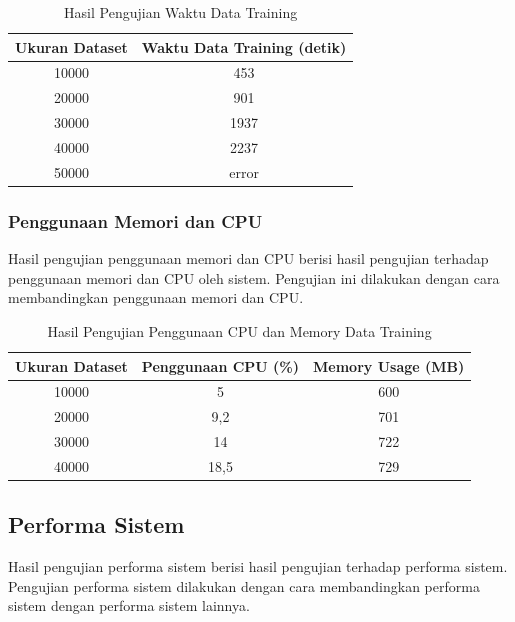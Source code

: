 \begin{table}[H]
    \centering
    \begin{tabular}{|c|c|}
    \hline
    \textbf{Ukuran Dataset} & \textbf{Waktu Data Training (detik)} \\
    \hline
    10000 & 453 \\
    \hline
    20000 & 901 \\
    \hline
    30000 & 1937 \\
    \hline
    40000 & 2237 \\
    \hline
    50000 & error \\
    \hline
    \end{tabular}
    \caption{Hasil Pengujian Waktu Data Training}
    \label{table:1}
\end{table}


\subsubsection{Penggunaan Memori dan CPU}
Hasil pengujian penggunaan memori dan CPU berisi hasil pengujian terhadap penggunaan memori dan CPU oleh sistem. Pengujian ini dilakukan dengan cara membandingkan penggunaan memori dan CPU.

\begin{table}[H]
    \centering
    \begin{tabular}{|c|c|c|}
    \hline
    \textbf{Ukuran Dataset} & \textbf{Penggunaan CPU (\%)} & \textbf{Memory Usage (MB)} \\
    \hline
    10000 & 5 & 600 \\
    \hline
    20000 & 9,2 & 701 \\
    \hline
    30000 & 14 & 722 \\
    \hline
    40000 & 18,5 & 729 \\
    \hline
    \end{tabular}
    \caption{Hasil Pengujian Penggunaan CPU dan Memory Data Training}
    \label{table:1}
\end{table}


\subsection{Performa Sistem}
Hasil pengujian performa sistem berisi hasil pengujian terhadap performa sistem. Pengujian performa sistem dilakukan dengan cara membandingkan performa sistem dengan performa sistem lainnya.
